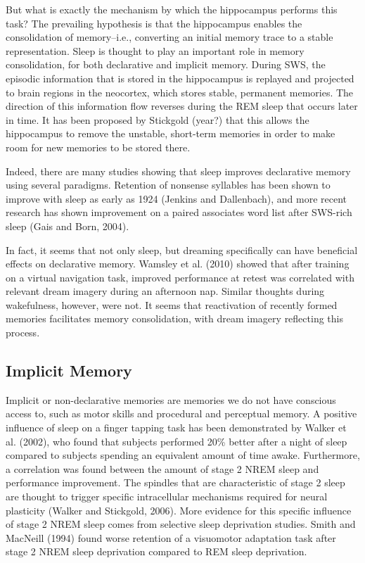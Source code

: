 \documentclass[10pt,letterpaper]{article}
\begin{document}
But what is exactly the mechanism by which the hippocampus performs this task? The prevailing hypothesis is that the hippocampus enables the consolidation of memory--i.e., converting an initial memory trace to a stable representation. Sleep is thought to play an important role in memory consolidation, for both declarative and implicit memory. During SWS, the episodic information that is stored in the hippocampus is replayed and projected to brain regions in the neocortex, which stores stable, permanent memories. The direction of this information flow reverses during the REM sleep that occurs later in time. It has been proposed by Stickgold (year?) that this allows the hippocampus to remove the unstable, short-term memories in order to make room for new memories to be stored there.

Indeed, there are many studies showing that sleep improves declarative memory using several paradigms. Retention of nonsense syllables has been shown to improve with sleep as early as 1924 (Jenkins and Dallenbach), and more recent research has shown improvement on a paired associates word list after SWS-rich sleep (Gais and Born, 2004). 

In fact, it seems that not only sleep, but dreaming specifically can have beneficial effects on declarative memory. Wamsley et al. (2010) showed that after training on a virtual navigation task, improved performance at retest was correlated with relevant dream imagery during an afternoon nap. Similar thoughts during wakefulness, however, were not. It seems that reactivation of recently formed memories facilitates memory consolidation, with dream imagery reflecting this process.

\subsection{Implicit Memory}

Implicit or non-declarative memories are memories we do not have conscious access to, such as motor skills and procedural and perceptual memory. A positive influence of sleep on a finger tapping task has been demonstrated by Walker et al. (2002), who found that subjects performed 20\% better after a night of sleep compared to subjects spending an equivalent amount of time awake. Furthermore, a correlation was found between the amount of stage 2 NREM sleep and performance improvement. The spindles that are characteristic of stage 2 sleep are thought to trigger specific intracellular mechanisms required for neural plasticity (Walker and Stickgold, 2006). More evidence for this specific influence of stage 2 NREM sleep comes from selective sleep deprivation studies. Smith and MacNeill (1994) found worse retention of a visuomotor adaptation task after stage 2 NREM sleep deprivation compared to REM sleep deprivation.
\end{document}
